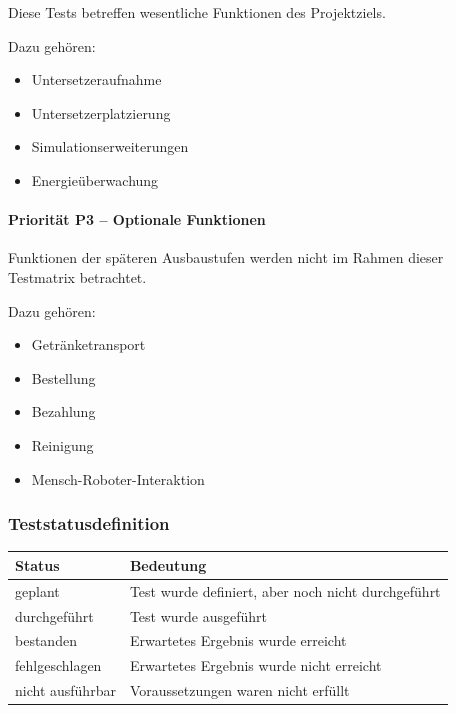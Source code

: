 Diese Tests betreffen wesentliche Funktionen des Projektziels.

Dazu gehören:

\begin{itemize}
\tightlist
\item
  Untersetzeraufnahme
\item
  Untersetzerplatzierung
\item
  Simulationserweiterungen
\item
  Energieüberwachung
\end{itemize}

\paragraph{Priorität P3 -- Optionale
Funktionen}\label{priorituxe4t-p3-optionale-funktionen}

Funktionen der späteren Ausbaustufen werden nicht im Rahmen dieser
Testmatrix betrachtet.

Dazu gehören:

\begin{itemize}
\tightlist
\item
  Getränketransport
\item
  Bestellung
\item
  Bezahlung
\item
  Reinigung
\item
  Mensch-Roboter-Interaktion
\end{itemize}

\subsubsection{Teststatusdefinition}\label{teststatusdefinition}

\begin{longtable}[]{@{}
  >{\raggedright\arraybackslash}p{}
  >{\raggedright\arraybackslash}p{}@{}}
\toprule\noalign{}
\begin{minipage}[b]{\linewidth}\raggedright
Status
\end{minipage} & \begin{minipage}[b]{\linewidth}\raggedright
Bedeutung
\end{minipage} \\
\midrule\noalign{}
\endhead
\bottomrule\noalign{}
\endlastfoot
geplant & Test wurde definiert, aber noch nicht durchgeführt \\
durchgeführt & Test wurde ausgeführt \\
bestanden & Erwartetes Ergebnis wurde erreicht \\
fehlgeschlagen & Erwartetes Ergebnis wurde nicht erreicht \\
nicht ausführbar & Voraussetzungen waren nicht erfüllt \\
\end{longtable}

